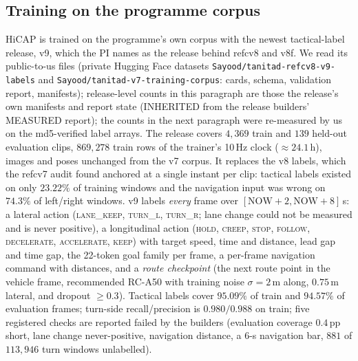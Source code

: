 \subsection{Training on the programme corpus}\label{sec:training-data}
HiCAP is trained on the programme's own corpus with the newest tactical-label release, v9, which the PI names as the release behind refcv8 and v8f. We read its public-to-us files (private Hugging Face datasets \texttt{Sayood/tanitad-refcv8-v9-labels} and \texttt{Sayood/tanitad-v7-training-corpus}: cards, schema, validation report, manifests); release-level counts in this paragraph are those the release's own manifests and report state (INHERITED from the release builders' MEASURED report); the counts in the next paragraph were re-measured by us on the md5-verified label arrays.
The release covers $4{,}369$ train and $139$ held-out evaluation clips, $869{,}278$ train rows of the trainer's 10\,Hz clock ($\approx24.1$\,h), images and poses unchanged from the v7 corpus. It replaces the v8 labels, which the refcv7 audit found anchored at a single instant per clip: tactical labels existed on only $23.22\%$ of training windows and the navigation input was wrong on $74.3\%$ of left/right windows. v9 labels \emph{every} frame over $[\text{NOW}+2,\text{NOW}+8]$\,s: a lateral action (\textsc{lane\_keep}, \textsc{turn\_l}, \textsc{turn\_r}; lane change could not be measured and is never positive), a longitudinal action (\textsc{hold}, \textsc{creep}, \textsc{stop}, \textsc{follow}, \textsc{decelerate}, \textsc{accelerate}, \textsc{keep}) with target speed, time and distance, lead gap and time gap, the 22-token goal family per frame, a per-frame navigation command with distances, and a \emph{route checkpoint} (the next route point in the vehicle frame, recommended RC-A50 with training noise $\sigma=2$\,m along, $0.75$\,m lateral, and dropout $\ge0.3$). Tactical labels cover $95.09\%$ of train and $94.57\%$ of evaluation frames; turn-side recall/precision is $0.980/0.988$ on train; five registered checks are reported failed by the builders (evaluation coverage $0.4$\,pp short, lane change never-positive, navigation distance, a 6-s navigation bar, $881$ of $113{,}946$ turn windows unlabelled).
